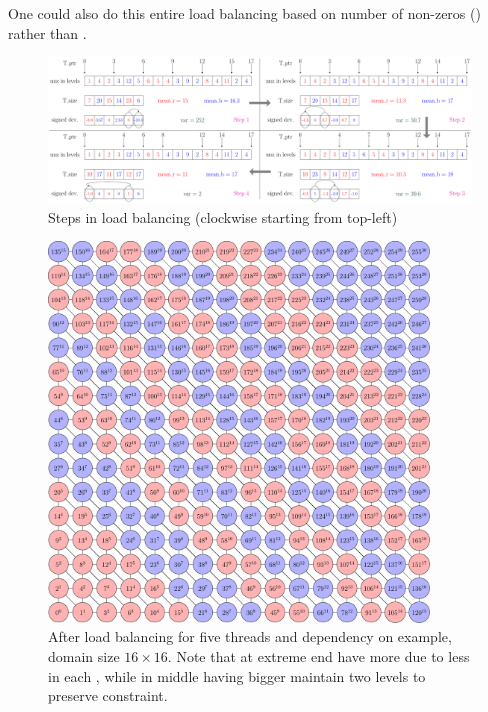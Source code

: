   One could also do this entire load balancing based on number of non-zeros (\nnz) rather than \nrows.
  
   \begin{figure}[tbhp]
   	\centering
   	\includegraphics[height=0.22\textheight,width=\textwidth]{pics/load_balancing/lb_alg/lb_all}
   	\caption{Steps in load balancing (clockwise starting from top-left)}
   	\label{fig:lb_alg}
   \end{figure}
   
    
    \begin{figure}
      \begin{minipage}[c]{0.63\textwidth}
      	\includegraphics[height=0.26\textheight,width=0.9\textwidth]{pics/load_balancing/2d-7pt/stencil_2d_7pt}
      \end{minipage}\hfill
      \begin{minipage}[c]{0.34\textwidth}
      	\caption{After load balancing for five threads and \DTWO dependency on \STEX example, domain size $16 \times 16$. Note that \levelGroups at extreme end have more \levels due to less \nrows in each \level, while \levelGroups in middle having bigger \levels maintain two levels to preserve \DTWO constraint.
      	} \label{fig:2d_7pt_lb}
      \end{minipage}
     \end{figure}
     

